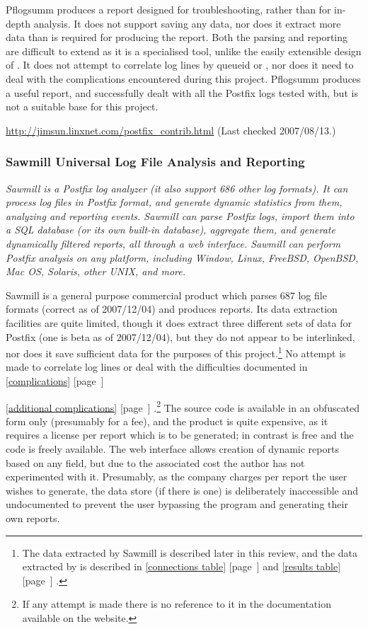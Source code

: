 \documentclass[a4paper,12pt,draft]{article}
\newcommand{\parsername}{\PLP{}}
\newcommand{\refwithpage}[1]{%
    \empty{}\ref{#1} [page~\pageref{#1}]%
}
\newcommand{\sectionref}[1]{%
    \textsection{}\refwithpage{#1}%
}
\begin{document}
Pflogsumm produces a report designed for troubleshooting, rather than for
in-depth analysis.  It does not support saving any data, nor does it
extract more data than is required for producing the report.  Both the
parsing and reporting are difficult to extend as it is a specialised tool,
unlike the easily extensible design of \parsername{}.  It does not attempt
to correlate log lines by queueid or \pid{}, nor does it need to deal with
the complications encountered during this project.  Pflogsumm produces a
useful report, and successfully dealt with all the Postfix logs tested
with, but is not a suitable base for this project.

\url{http://jimsun.linxnet.com/postfix_contrib.html} \newline (Last checked
2007/08/13.)

\subsubsection{Sawmill Universal Log File Analysis and Reporting}

\textit{ Sawmill is a Postfix log analyzer (it also support 686 other log
formats).  It can process log files in Postfix format, and generate dynamic
statistics from them, analyzing and reporting events.  Sawmill can parse
Postfix logs, import them into a SQL database (or its own built-in
database), aggregate them, and generate dynamically filtered reports, all
through a web interface.  Sawmill can perform Postfix analysis on any
platform, including Window, Linux, FreeBSD, OpenBSD, Mac OS, Solaris, other
UNIX, and more.\/}

Sawmill is a general purpose commercial product which parses 687 log file
formats (correct as of 2007/12/04) and produces reports.  Its data
extraction facilities are quite limited, though it does extract three
different sets of data for Postfix (one is beta as of 2007/12/04), but they
do not appear to be interlinked, nor does it save sufficient data for the
purposes of this project.\footnote{The data extracted by Sawmill is
described later in this review, and the data extracted by \PLP{} is
described in \sectionref{connections table} and \sectionref{results
table}.}  No attempt is made to correlate log lines or deal with the
difficulties documented in \sectionref{complications}
\sectionref{additional complications}.\footnote{If any attempt is made
there is no reference to it in the documentation available on the website.}
The source code is available in an obfuscated form only (presumably for a
fee), and the product is quite expensive, as it requires a license per
report which is to be generated; in contrast \parsername{} is free and the
code is freely available.  The web interface allows creation of dynamic
reports based on any field, but due to the associated cost the author has
not experimented with it.  Presumably, as the company charges per report
the user wishes to generate, the data store (if there is one) is
deliberately inaccessible and undocumented to prevent the user bypassing
the program and generating their own reports.
\end{document}
